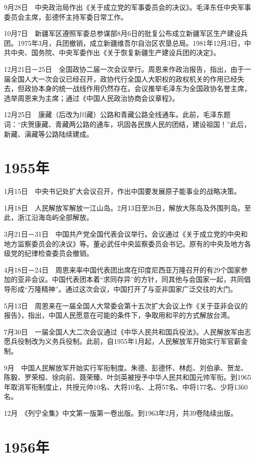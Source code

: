 \documentclass[10pt,a4paper,twocolumn]{book}
\begin{document}
9月28日　中央政治局作出《关于成立党的军事委员会的决议》。毛泽东任中央军事委员会主席，彭德怀主持军委日常工作。

10月7日　新疆军区遵照军委总参谋部8月6日的批复公布成立新疆军区生产建设兵团。1975年3月，兵团撤销，成立新疆维吾尔自治区农垦总局。1981年12月3日，中共中央、国务院、中央军委作出《关于恢复新疆生产建设兵团的决定》。

12月21日－25日　全国政协二届一次会议举行。周恩来作政治报告，指出，由于一届全国人大一次会议已经召开，政协代行全国人大职权的政权机关的作用已经失去，但政协本身的统一战线作用仍然存在。会议推举毛泽东为全国政协名誉主席，选举周恩来为主席；通过《中国人民政治协商会议章程》。

12月25日　康藏（后改为川藏）公路和青藏公路全线通车。此前，毛泽东题词：“庆贺康藏、青藏两公路的通车，巩固各民族人民的团结，建设祖国！”此后，新藏、滇藏等公路陆续建成。

\section{1955年}

1月15日　中央书记处扩大会议召开，作出中国要发展原子能事业的战略决策。

1月18日　人民解放军解放一江山岛。2月13日至26日，解放大陈岛及外围列岛。至此，浙江沿海岛屿全部解放。

3月21日－31日　中国共产党全国代表会议举行。会议通过《关于成立党的中央和地方监察委员会的决议》等。董必武任中央监察委员会书记。原有的中央及地方各级党的纪律检查委员会撤销。

4月18日－24日　周恩来率中国代表团出席在印度尼西亚万隆召开的有29个国家参加的亚非会议。中国代表团本着“求同存异”的方针，同其他与会国家一起，共同倡导形成“万隆精神”。通过这次会议，中国打开了与亚非国家广泛交往的大门。

5月13日　周恩来在一届全国人大常委会第十五次扩大会议上作《关于亚非会议的报告》，指出，中国人民愿意在可能的条件下，争取用和平的方式解放台湾。

7月30日　一届全国人大二次会议通过《中华人民共和国兵役法》。人民解放军由志愿兵役制改为义务兵役制。此前，自1955年1月起，人民解放军开始实行军官薪金制。

9月　中国人民解放军开始实行军衔制度。朱德、彭德怀、林彪、刘伯承、贺龙、陈毅、罗荣桓、徐向前、聂荣臻、叶剑英被授予中华人民共和国元帅军衔。到1965年取消军衔制度止，共授元帅10名、大将10名、上将57名、中将177名、少将1360名。

12月　《列宁全集》中文第一版第一卷出版。到1963年2月，共39卷陆续出版。

\section{1956年}
\end{document}
